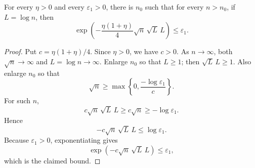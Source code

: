 \begin{helper}
For every \(\eta>0\) and every \(\varepsilon_1>0\), there is \(n_0\) such
that for every \(n>n_0\), if \(L=\log n\), then
\[
\exp\!\left(-\frac{\eta(1+\eta)}4\sqrt n\,\sqrt L\,L\right)
\le \varepsilon_1.
\]
\end{helper}
\begin{proof}
Put \(c=\eta(1+\eta)/4\).  Since \(\eta>0\), we have \(c>0\).  As
\(n\to\infty\), both \(\sqrt n\to\infty\) and \(L=\log n\to\infty\).  Enlarge
\(n_0\) so that \(L\ge1\); then \(\sqrt L\,L\ge1\).  Also enlarge \(n_0\) so that
\[
\sqrt n\ge \max\left\{0,\frac{-\log\varepsilon_1}{c}\right\}.
\]
For such \(n\),
\[
c\sqrt n\,\sqrt L\,L\ge c\sqrt n\ge -\log\varepsilon_1.
\]
Hence
\[
-c\sqrt n\,\sqrt L\,L\le \log\varepsilon_1.
\]
Because \(\varepsilon_1>0\), exponentiating gives
\[
\exp(-c\sqrt n\,\sqrt L\,L)\le\varepsilon_1,
\]
which is the claimed bound.
\end{proof}

